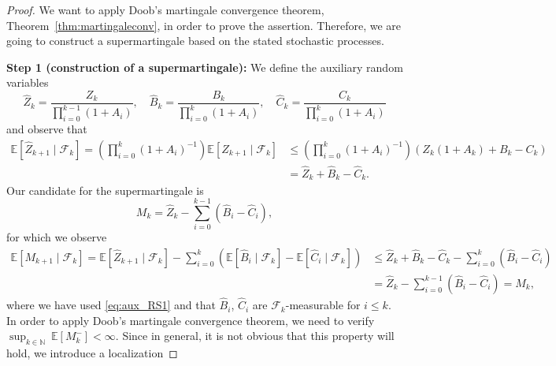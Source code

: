 \documentclass[12pt,openany]{book}
\theoremstyle{definition}
\theoremstyle{definition}
\newcommand{\E}{\mathbb{E}}
\newcommand{\N}{\mathbb{N}}
\begin{document}
\begin{proof}
We want to apply Doob's martingale convergence theorem, Theorem~\ref{thm:martingaleconv}, in order to prove the assertion. Therefore, we are going to construct a supermartingale based on the stated stochastic processes.

\textbf{Step 1 (construction of a supermartingale):} We define the auxiliary random variables
\[\widehat Z_k = \frac{Z_k}{\prod_{i=0}^{k-1} (1+ A_i)}, \quad \widehat B_k = \frac{B_k}{\prod_{i=0}^{k} (1+ A_i)},\quad  \widehat C_k = \frac{C_k}{\prod_{i=0}^{k} (1+ A_i)} \]
and observe that
\begin{equation}\label{eq:aux_RS1}
\begin{split}
\mathbb E[\widehat Z_{k+1}\mid \mathcal F_k] = \left(\prod_{i=0}^{k} (1+A_i)^{-1}\right) \E[Z_{k+1}\mid \mathcal F_k] &\leq \left(\prod_{i=0}^{k}(1+A_i)^{-1}\right)\left(Z_k(1+A_k) + B_k - C_k \right)\\ & = \widehat Z_k + \widehat B_k - \widehat C_k.
\end{split}
\end{equation}
Our candidate for the supermartingale is
\[M_k = \widehat Z_k - \sum_{i=0}^{k-1}(\widehat B_i - \widehat C_i),\]
for which we observe
\begin{align*}
\E[M_{k+1}\mid \mathcal F_k]  = \E[\widehat Z_{k+1}\mid\mathcal F_k] - \sum_{i=0}^k \left(\E[\widehat B_i\mid \mathcal F_k] - \E[\widehat C_i\mid \mathcal F_k] \right)
&\le \widehat Z_k + \widehat B_k- \widehat C_k - \sum_{i=0}^k (\widehat B_i - \widehat C_i)\\
&= \widehat Z_k - \sum_{i=0}^{k-1} (\widehat B_i- \widehat C_i) = M_k,
\end{align*}
where we have used \eqref{eq:aux_RS1} and that $\widehat B_i$, $\widehat C_i$ are $\mathcal F_k$-measurable for $i\le k$. In order to apply Doob's martingale convergence theorem, we need to verify $\sup_{k\in\N}\ \E[M_k^{-}]<\infty$. Since in general, it is not obvious that this property will hold, we introduce a localization


\end{proof}
\end{document}
